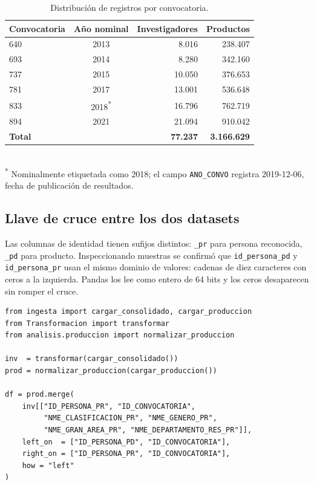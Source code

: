 \documentclass[11pt,a4paper,oneside]{article}
\begin{document}
\medskip
\begin{table}[h]
\centering
\caption{Distribución de registros por convocatoria.}
\label{tab:convocatorias}
\small
\begin{tabular}{l c r r}
\toprule
\textbf{Convocatoria} & \textbf{Año nominal} & \textbf{Investigadores} & \textbf{Productos} \\
\midrule
640 & 2013 & 8.016 & 238.407 \\
693 & 2014 & 8.280 & 342.160 \\
737 & 2015 & 10.050 & 376.653 \\
781 & 2017 & 13.001 & 536.648 \\
833 & 2018\textsuperscript{*} & 16.796 & 762.719 \\
894 & 2021 & 21.094 & 910.042 \\
\midrule
\textbf{Total} &  & \textbf{77.237} & \textbf{3.166.629} \\
\bottomrule
\end{tabular}\\[0.4em]
{\footnotesize\color{rule}\textsuperscript{*} Nominalmente etiquetada como 2018; el campo \texttt{ANO\_CONVO} registra 2019-12-06, fecha de publicación de resultados.}
\end{table}

\subsection{Llave de cruce entre los dos datasets}\label{ssec:llave}

Las columnas de identidad tienen sufijos distintos: \texttt{\_pr} para persona reconocida, \texttt{\_pd} para producto. Inspeccionando muestras se confirmó que \texttt{id\_persona\_pd} y \texttt{id\_persona\_pr} usan el mismo dominio de valores: cadenas de diez caracteres con ceros a la izquierda. Pandas los lee como entero de 64 bits y los ceros desaparecen sin romper el cruce.

\begin{lstlisting}[caption={Cruce validado entre las dos fuentes.}]
from ingesta import cargar_consolidado, cargar_produccion
from Transformacion import transformar
from analisis.produccion import normalizar_produccion

inv  = transformar(cargar_consolidado())
prod = normalizar_produccion(cargar_produccion())

df = prod.merge(
    inv[["ID_PERSONA_PR", "ID_CONVOCATORIA",
         "NME_CLASIFICACION_PR", "NME_GENERO_PR",
         "NME_GRAN_AREA_PR", "NME_DEPARTAMENTO_RES_PR"]],
    left_on  = ["ID_PERSONA_PD", "ID_CONVOCATORIA"],
    right_on = ["ID_PERSONA_PR", "ID_CONVOCATORIA"],
    how = "left"
)
\end{lstlisting}
\end{document}
